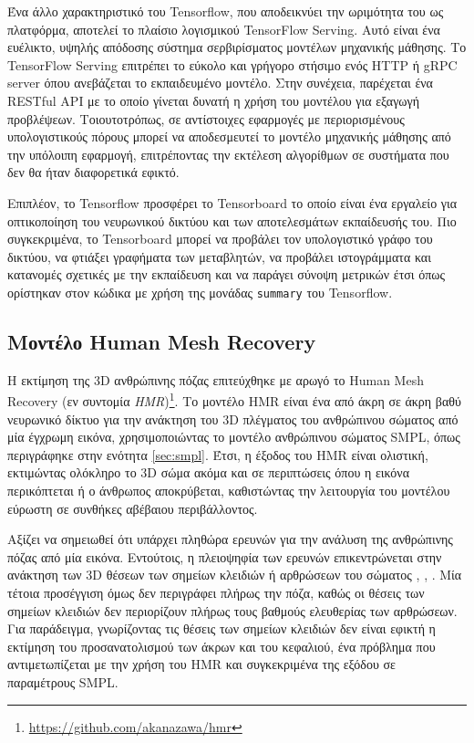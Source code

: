 Ένα άλλο χαρακτηριστικό του Tensorflow, που αποδεικνύει την ωριμότητα του ως πλατφόρμα, αποτελεί το πλαίσιο λογισμικού TensorFlow Serving. Αυτό είναι ένα ευέλικτο, υψηλής απόδοσης σύστημα σερβιρίσματος μοντέλων μηχανικής μάθησης. Το TensorFlow Serving επιτρέπει το εύκολο και γρήγορο στήσιμο ενός HTTP ή gRPC server όπου ανεβάζεται το εκπαιδευμένο μοντέλο. Στην συνέχεια, παρέχεται ένα RESTful API με το οποίο γίνεται δυνατή η χρήση του μοντέλου για εξαγωγή προβλέψεων. Τοιουτοτρόπως, σε αντίστοιχες εφαρμογές με περιορισμένους υπολογιστικούς πόρους μπορεί να αποδεσμευτεί το μοντέλο μηχανικής μάθησης από την υπόλοιπη εφαρμογή, επιτρέποντας την εκτέλεση αλγορίθμων σε συστήματα που δεν θα ήταν διαφορετικά εφικτό.

Επιπλέον, το Tensorflow προσφέρει το Tensorboard το οποίο είναι ένα εργαλείο για οπτικοποίηση του νευρωνικού δικτύου και των αποτελεσμάτων εκπαίδευσής του. Πιο συγκεκριμένα, το Tensorboard μπορεί να προβάλει τον υπολογιστικό γράφο του δικτύου, να φτιάξει γραφήματα των μεταβλητών, να προβάλει ιστογράμματα και κατανομές σχετικές με την εκπαίδευση και να παράγει σύνοψη μετρικών έτσι όπως ορίστηκαν στον κώδικα με χρήση της μονάδας \texttt{summary} του Tensorflow.

\subsection{Μοντέλο Human Mesh Recovery}
\label{sec:hmr}
Η εκτίμηση της 3D ανθρώπινης πόζας επιτεύχθηκε με αρωγό το Human Mesh Recovery (εν συντομία \textsl{HMR})\footnote{\href{https://github.com/akanazawa/hmr}{https://github.com/akanazawa/hmr}}\cite{hmr_paper}. Το μοντέλο HMR είναι ένα από άκρη σε άκρη βαθύ νευρωνικό δίκτυο για την ανάκτηση του 3D πλέγματος του ανθρώπινου σώματος από μία έγχρωμη εικόνα, χρησιμοποιώντας το μοντέλο ανθρώπινου σώματος SMPL, όπως περιγράφηκε στην ενότητα \ref{sec:smpl}. Έτσι, η έξοδος του HMR είναι ολιστική, εκτιμώντας ολόκληρο το 3D σώμα ακόμα και σε περιπτώσεις όπου η εικόνα περικόπτεται ή ο άνθρωπος αποκρύβεται, καθιστώντας την λειτουργία του μοντέλου εύρωστη σε συνθήκες αβέβαιου περιβάλλοντος.

Αξίζει να σημειωθεί ότι υπάρχει πληθώρα ερευνών για την ανάλυση της ανθρώπινης πόζας από μία εικόνα. Εντούτοις, η πλειοψηφία των ερευνών επικεντρώνεται στην ανάκτηση των 3D θέσεων των σημείων κλειδιών ή αρθρώσεων του σώματος \cite{pavlakos_paper}, \cite{lifting_from_the_deep}, \cite{margipose_paper}. Μία τέτοια προσέγγιση όμως δεν περιγράφει πλήρως την πόζα, καθώς οι θέσεις των σημείων κλειδιών δεν περιορίζουν πλήρως τους βαθμούς ελευθερίας των αρθρώσεων. Για παράδειγμα, γνωρίζοντας τις θέσεις των σημείων κλειδιών δεν είναι εφικτή η εκτίμηση του προσανατολισμού των άκρων και του κεφαλιού, ένα πρόβλημα που αντιμετωπίζεται με την χρήση του HMR και συγκεκριμένα της εξόδου σε παραμέτρους SMPL.

